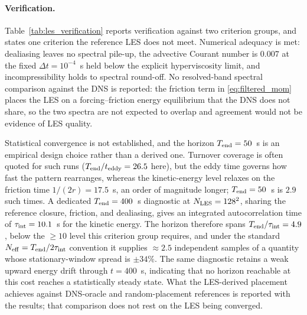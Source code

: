 \paragraph{Verification.}
\label{subsec:les_verification}
Table~\ref{tab:les_verification} reports verification against two criterion groups, and states one criterion the reference LES does not meet. Numerical adequacy is met: dealiasing leaves no spectral pile-up, the advective Courant number is $0.007$ at the fixed $\Delta t = 10^{-4}$~s held below the explicit hyperviscosity limit, and incompressibility holds to spectral round-off. No resolved-band spectral comparison against the DNS is reported: the friction term in \eqref{eq:filtered_mom} places the LES on a forcing--friction energy equilibrium that the DNS does not share, so the two spectra are not expected to overlap and agreement would not be evidence of LES quality.

Statistical convergence is not established, and the horizon $T_{\rm end}=50$~s is an empirical design choice rather than a derived one. Turnover coverage is often quoted for such runs ($T_{\rm end}/t_{\rm eddy}=26.5$ here), but the eddy time governs how fast the pattern rearranges, whereas the kinetic-energy level relaxes on the friction time $1/(2r) = 17.5$~s, an order of magnitude longer; $T_{\rm end}=50$~s is $2.9$ such times. A dedicated $T_{\rm end}=400$~s diagnostic at $N_{\rm LES}=128^2$, sharing the reference closure, friction, and dealiasing, gives an integrated autocorrelation time of $\tau_{\rm int}=10.1$~s for the kinetic energy. The horizon therefore spans $T_{\rm end}/\tau_{\rm int}=4.9$, below the $\ge 10$ level this criterion group requires, and under the standard $N_{\rm eff}=T_{\rm end}/2\tau_{\rm int}$ convention it supplies $\approx 2.5$ independent samples of a quantity whose stationary-window spread is $\pm 34\%$. The same diagnostic retains a weak upward energy drift through $t=400$~s, indicating that no horizon reachable at this cost reaches a statistically steady state. What the LES-derived placement achieves against DNS-oracle and random-placement references is reported with the results; that comparison does not rest on the LES being converged.

